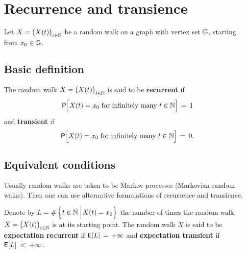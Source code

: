 \chapter{Recurrence and transience}

Let $X = \big(X(t)\big)_{t \in \mathbb{N}}$ be a random walk on a graph with
vertex set $\mathbb{G}$, starting from $x_0 \in \mathbb{G}$.

\section{Basic definition}

\begin{definition}%
  \label{def:recurrence}
  The random walk $X = \big(X(t)\big)_{t \in \mathbb{N}}$
  is said to be \textbf{recurrent} if
  \begin{align*}
  \mathsf{P}\Big[ X(t) = x_0 \text{ for infinitely many } t \in \mathbb{N} \Big] \, = \, 1
  \end{align*}
  and \textbf{transient} if
  \begin{align*}
  \mathsf{P}\Big[ X(t) = x_0 \text{ for infinitely many } t \in \mathbb{N} \Big] \, = \, 0 .
  \end{align*}

\end{definition}



\section{Equivalent conditions}

Usually random walks are taken to be Markov processes (Markovian random walks).
Then one can use alternative formulations of recurrence and transience.

\begin{definition}%
  \label{def:expectation_recurrence}
  Denote by
  $L = \# \left\{ t \in \mathbb{N} \, \Big| \, X(t) = x_0 \right\}$ the number of times
  the random walk $X = \big(X(t)\big)_{t \in \mathbb{N}}$ is at its starting point.
  The random walk $X$ is said to be \textbf{expectation recurrent} if
  $\mathsf{E} [ L ] \, = \, +\infty$
  and \textbf{expectation transient} if
  $\mathsf{E} [ L ] \; < \; +\infty$.
\end{definition}

